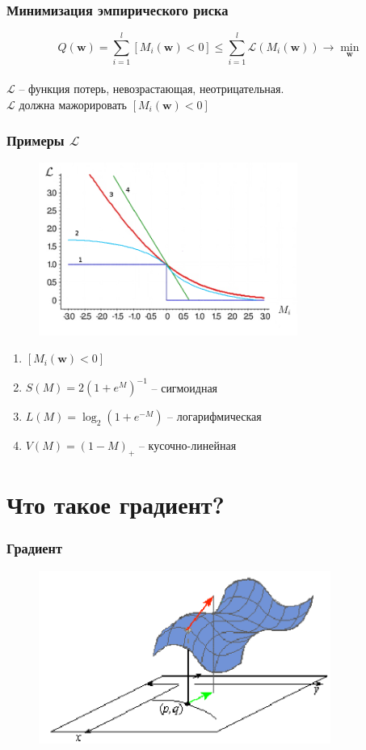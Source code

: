\documentclass[10pt]{beamer}
\begin{document}
\begin{frame}\frametitle{Минимизация эмпирического риска}
	$${Q(\mathbf{w}) = \sum\limits_{i=1}^l \left[ M_i(\mathbf{w}) < 0 \right] \leq \sum\limits_{i=1}^l \mathcal{L}(M_i(\mathbf{w})) \rightarrow \min\limits_{\mathbf{w}} }$$\\
	\bigbreak
	$\mathcal{L}$ -- функция потерь, невозрастающая, неотрицательная.\\
	$\mathcal{L}$ должна мажорировать $\left[M_i(\mathbf{w}) < 0 \right]$
\end{frame}

\begin{frame}\frametitle{Примеры $\mathcal{L}$}
	\begin{figure}[htbp]
	  \includegraphics[height=160pt, keepaspectratio = true]{images/l}
	\end{figure}

	\begin{enumerate}
		\item $\left[M_i(\mathbf{w}) < 0 \right]$
		\item $S(M) = 2(1+e^M)^{-1}$ -- сигмоидная
		\item $L(M) = \log_2(1+e^{-M})$ -- логарифмическая
		\item $V(M) = (1-M)_+$ -- кусочно-линейная
	\end{enumerate}
\end{frame}

\section{Что такое градиент?}

\begin{frame}\frametitle{Градиент}
	\begin{figure}[htbp]
	  \includegraphics[height=160pt, keepaspectratio = true]{images/gradient}
	\end{figure}
\end{frame}
\end{document}
